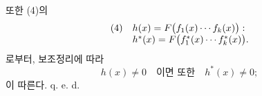 
또한 (4)의
\[
\begin{array}{@{}l@{\quad}l@{}}
(4)& h(x)=F\bigl(f_1(x)\cdots f_k(x)\bigr):\\
& h^*(x)=F\bigl(f_1^*(x)\cdots f_k^*(x)\bigr).
\end{array}
\]
로부터, 보조정리에 따라
\[
h(x)\ne0\quad\text{이면 또한}\quad h^*(x)\ne0;
\]
이 따른다.
q. e. d.
